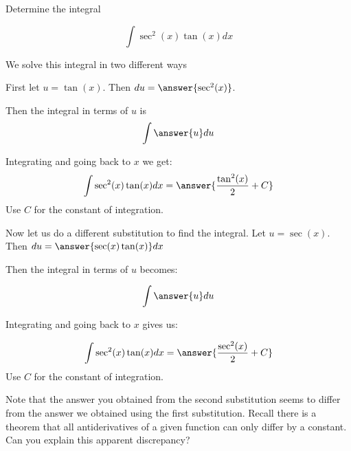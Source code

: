 \documentclass{ximera}
\author{Jason Miller}
\begin{document}
\begin{exercise}
Determine the integral

\[
\int \sec^{2}(x) \tan(x) dx
\]

We solve this integral in two different ways


First let $u=\tan(x)$. Then $du=\answer{ \sec^{2}(x)}$. 

Then the integral in terms of $u$ is
\[
\int \answer{u} du
\]

Integrating and going back to $x$ we get:
\[
\int \sec^{2}(x)\tan(x) dx= \answer{  \frac{ \tan^{2}(x)}{2}  + C}
\]
Use $C$ for the constant of integration. 

\begin{exercise}

Now let us do a different substitution to find the integral. Let $u=\sec(x)$. Then $du=\answer{ \sec(x) \tan(x)} dx$

Then the integral in terms of $u$ becomes:

\[
\int \answer{u} du 
\]

Integrating and going back to $x$ gives us:

\[
\int \sec^{2}(x) \tan(x) dx= \answer{  \frac{ \sec^{2}(x) }{2}+ C}
\]
Use $C$ for the constant of integration. 

Note that the answer you obtained from the second substitution seems to differ from the answer we obtained using the first substitution. Recall there is a theorem that all antiderivatives 
of a given function can only differ by a constant. Can you explain this apparent discrepancy?
\end{exercise}



\end{exercise}
\end{document}

